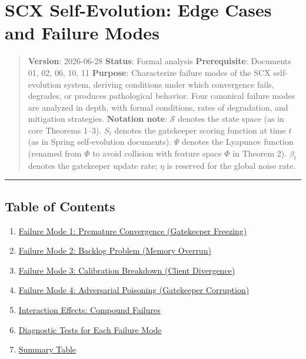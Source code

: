 \documentclass[
  12pt,
]{article}
\author{SCX}
\date{2026}
\providecommand{\tightlist}{%
  \setlength{\itemsep}{0pt}\setlength{\parskip}{0pt}}
\begin{document}
\section{SCX Self-Evolution: Edge Cases and Failure
Modes}\label{scx-self-evolution-edge-cases-and-failure-modes}

\begin{quote}
\textbf{Version}: 2026-06-28 \textbar{} \textbf{Status}: Formal analysis
\textbar{} \textbf{Prerequisite}: Documents 01, 02, 06, 10, 11
\textbf{Purpose}: Characterize failure modes of the SCX self-evolution
system, deriving conditions under which convergence fails, degrades, or
produces pathological behavior. Four canonical failure modes are
analyzed in depth, with formal conditions, rates of degradation, and
mitigation strategies. \textbf{Notation note}: \(\mathcal{S}\) denotes
the state space (as in core Theorems 1--3). \(S_t\) denotes the
gatekeeper scoring function at time \(t\) (as in Spring self-evolution
documents). \(\Psi\) denotes the Lyapunov function (renamed from
\(\Phi\) to avoid collision with feature space \(\Phi\) in Theorem 2).
\(\beta_t\) denotes the gatekeeper update rate; \(\eta\) is reserved for
the global noise rate.
\end{quote}

\begin{center}\rule{0.5\linewidth}{0.5pt}\end{center}

\subsection{Table of Contents}\label{table-of-contents}

\begin{enumerate}
\def\labelenumi{\arabic{enumi}.}
\tightlist
\item
  \hyperref[1-failure-mode-1-premature-convergence-gatekeeper-freezing]{Failure
  Mode 1: Premature Convergence (Gatekeeper Freezing)}
\item
  \hyperref[2-failure-mode-2-backlog-problem-memory-overrun]{Failure
  Mode 2: Backlog Problem (Memory Overrun)}
\item
  \hyperref[3-failure-mode-3-calibration-breakdown-client-divergence]{Failure
  Mode 3: Calibration Breakdown (Client Divergence)}
\item
  \hyperref[4-failure-mode-4-adversarial-poisoning-gatekeeper-corruption]{Failure
  Mode 4: Adversarial Poisoning (Gatekeeper Corruption)}
\item
  \hyperref[5-interaction-effects-compound-failures]{Interaction
  Effects: Compound Failures}
\item
  \hyperref[6-diagnostic-tests-for-each-failure-mode]{Diagnostic Tests
  for Each Failure Mode}
\item
  \hyperref[7-summary-table]{Summary Table}
\end{enumerate}
\end{document}
